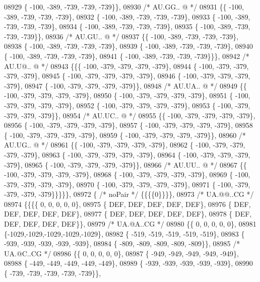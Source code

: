\begin{DoxyCode}
08929 \{ -100, -389, -739, -739, -739\}\},
08930 \textcolor{comment}{/* AU.GG.. @ */}
08931 \{\{ -100, -389, -739, -739, -739\},
08932 \{ -100, -389, -739, -739, -739\},
08933 \{ -100, -389, -739, -739, -739\},
08934 \{ -100, -389, -739, -739, -739\},
08935 \{ -100, -389, -739, -739, -739\}\},
08936 \textcolor{comment}{/* AU.GU.. @ */}
08937 \{\{ -100, -389, -739, -739, -739\},
08938 \{ -100, -389, -739, -739, -739\},
08939 \{ -100, -389, -739, -739, -739\},
08940 \{ -100, -389, -739, -739, -739\},
08941 \{ -100, -389, -739, -739, -739\}\}\},
08942 \textcolor{comment}{/* AU.U@.. @ */}
08943 \{\{\{ -100, -379, -379, -379, -379\},
08944 \{ -100, -379, -379, -379, -379\},
08945 \{ -100, -379, -379, -379, -379\},
08946 \{ -100, -379, -379, -379, -379\},
08947 \{ -100, -379, -379, -379, -379\}\},
08948 \textcolor{comment}{/* AU.UA.. @ */}
08949 \{\{ -100, -379, -379, -379, -379\},
08950 \{ -100, -379, -379, -379, -379\},
08951 \{ -100, -379, -379, -379, -379\},
08952 \{ -100, -379, -379, -379, -379\},
08953 \{ -100, -379, -379, -379, -379\}\},
08954 \textcolor{comment}{/* AU.UC.. @ */}
08955 \{\{ -100, -379, -379, -379, -379\},
08956 \{ -100, -379, -379, -379, -379\},
08957 \{ -100, -379, -379, -379, -379\},
08958 \{ -100, -379, -379, -379, -379\},
08959 \{ -100, -379, -379, -379, -379\}\},
08960 \textcolor{comment}{/* AU.UG.. @ */}
08961 \{\{ -100, -379, -379, -379, -379\},
08962 \{ -100, -379, -379, -379, -379\},
08963 \{ -100, -379, -379, -379, -379\},
08964 \{ -100, -379, -379, -379, -379\},
08965 \{ -100, -379, -379, -379, -379\}\},
08966 \textcolor{comment}{/* AU.UU.. @ */}
08967 \{\{ -100, -379, -379, -379, -379\},
08968 \{ -100, -379, -379, -379, -379\},
08969 \{ -100, -379, -379, -379, -379\},
08970 \{ -100, -379, -379, -379, -379\},
08971 \{ -100, -379, -379, -379, -379\}\}\}\}\},
08972 \{ \textcolor{comment}{/* noPair */} \{\{\{\{0\}\}\}\},
08973 \textcolor{comment}{/* UA.@@..CG */}
08974 \{\{\{\{    0,    0,    0,    0,    0\},
08975 \{  DEF,  DEF,  DEF,  DEF,  DEF\},
08976 \{  DEF,  DEF,  DEF,  DEF,  DEF\},
08977 \{  DEF,  DEF,  DEF,  DEF,  DEF\},
08978 \{  DEF,  DEF,  DEF,  DEF,  DEF\}\},
08979 \textcolor{comment}{/* UA.@A..CG */}
08980 \{\{    0,    0,    0,    0,    0\},
08981 \{-1029,-1029,-1029,-1029,-1029\},
08982 \{ -519, -519, -519, -519, -519\},
08983 \{ -939, -939, -939, -939, -939\},
08984 \{ -809, -809, -809, -809, -809\}\},
08985 \textcolor{comment}{/* UA.@C..CG */}
08986 \{\{    0,    0,    0,    0,    0\},
08987 \{ -949, -949, -949, -949, -949\},
08988 \{ -449, -449, -449, -449, -449\},
08989 \{ -939, -939, -939, -939, -939\},
08990 \{ -739, -739, -739, -739, -739\}\},

\end{DoxyCode}
